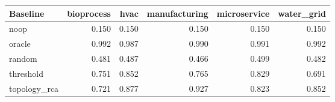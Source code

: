 \begin{tabular}{lrrrrr}
\toprule
Baseline & bioprocess & hvac & manufacturing & microservice & water\_grid \\
\midrule
noop & 0.150 & 0.150 & 0.150 & 0.150 & 0.150 \\
oracle & 0.992 & 0.987 & 0.990 & 0.991 & 0.992 \\
random & 0.481 & 0.487 & 0.466 & 0.499 & 0.482 \\
threshold & 0.751 & 0.852 & 0.765 & 0.829 & 0.691 \\
topology\_rca & 0.721 & 0.877 & 0.927 & 0.823 & 0.852 \\
\bottomrule
\end{tabular}
